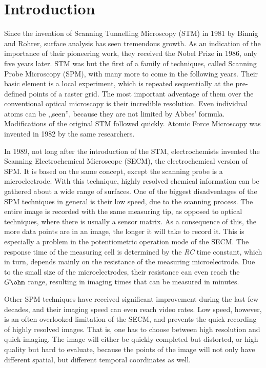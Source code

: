 \chapter{Introduction}
\pagestyle{headings}
Since the invention of Scanning Tunnelling Microscopy (STM) in 1981 by Binnig and Rohrer, surface analysis has seen tremendous growth. As an indication of the importance of their pioneering work, they received the Nobel Prize in 1986, only five years later. STM was but the first of a family of techniques, called Scanning Probe Microscopy (SPM), with many more to come in the following years. Their basic element is a local experiment, which is repeated sequentially at the pre-defined points of a raster grid. The most important adventage of them over the conventional optical microscopy is their incredible resolution. Even individual atoms can be ,,seen'', because they are not limited by Abbes' formula. Modifications of the original STM followed quickly. Atomic Force Microscopy was invented in 1982 by the same researchers.

In 1989, not long after the introduction of the STM, electrochemists invented the Scanning Electrochemical Microscope (SECM), the electrochemical version of SPM. It is based on the same concept, except the scanning probe is a microelectrode. With this technique, highly resolved chemical information can be gathered about a wide range of surfaces. One of the biggest disadventages of the SPM techniques in general is their low speed, due to the scanning process. The entire image is recorded with the same measuring tip, as opposed to optical techniques, where there is usually a sensor matrix. As a consequence of this, the more data points are in an image, the longer it will take to record it. This is especially a problem in the potentiometric operation mode of the SECM. The response time of the measuring cell is determined by the \emph{RC} time constant, which in turn, depends mainly on the resistance of the measuring microelectrode. Due to the small size of the microelectrodes, their resistance can even reach the $G\ohm$ range, resulting in imaging times that can be measured in minutes.

Other SPM techniques have received significant improvement during the last few decades, and their imaging speed can even reach video rates. Low speed, however, is an often overlooked limitation of the SECM, and prevents the quick recording of highly resolved images. That is, one has to choose between high resolution and quick imaging. The image will either be quickly completed but distorted, or high quality but hard to evaluate, because the points of the image will not only have different spatial, but different temporal coordinates as well.

